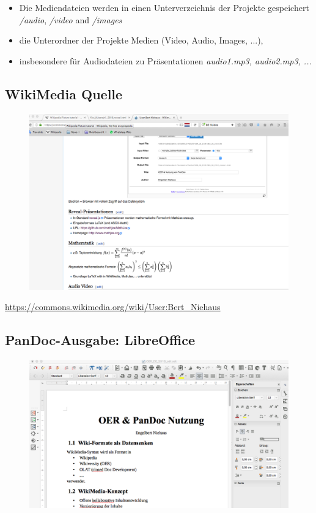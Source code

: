 \documentclass[]{article}
\providecommand{\tightlist}{%
  \setlength{\itemsep}{0pt}\setlength{\parskip}{0pt}}
\begin{document}
\begin{itemize}
\tightlist
\item
  Die Mediendateien werden in einen Unterverzeichnis der Projekte
  gespeichert \emph{/audio}, \emph{/video} and \emph{/images}
\item
  die Unterordner der Projekte Medien (Video, Audio, Images, ...),
\item
  insbesondere für Audiodateien zu Präsentationen \emph{audio1.mp3,
  audio2.mp3, ...}
\end{itemize}

\subsection{WikiMedia Quelle}\label{wikimedia-quelle}

\begin{figure}[htbp]
\centering
\includegraphics[width=6.77083in]{./images/PanDocWikiversity.png}
\caption{}
\end{figure}

\url{https://commons.wikimedia.org/wiki/User:Bert_Niehaus}

\subsection{PanDoc-Ausgabe:
LibreOffice}\label{pandoc-ausgabe-libreoffice}

\begin{figure}[htbp]
\centering
\includegraphics[width=6.77083in]{./images/PanDocLibreOffice1col.png}
\caption{}
\end{figure}
\end{document}
